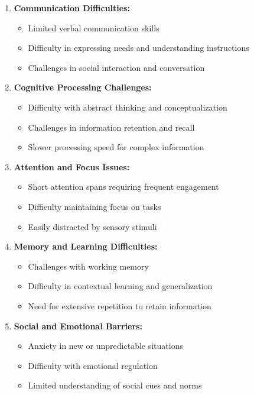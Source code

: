 \documentclass[12pt,a4paper]{article}
\begin{document}
\begin{enumerate}[leftmargin=*]
    \item \textbf{Communication Difficulties:}
    \begin{itemize}
        \item Limited verbal communication skills
        \item Difficulty in expressing needs and understanding instructions
        \item Challenges in social interaction and conversation
    \end{itemize}
    
    \item \textbf{Cognitive Processing Challenges:}
    \begin{itemize}
        \item Difficulty with abstract thinking and conceptualization
        \item Challenges in information retention and recall
        \item Slower processing speed for complex information
    \end{itemize}
    
    \item \textbf{Attention and Focus Issues:}
    \begin{itemize}
        \item Short attention spans requiring frequent engagement
        \item Difficulty maintaining focus on tasks
        \item Easily distracted by sensory stimuli
    \end{itemize}
    
    \item \textbf{Memory and Learning Difficulties:}
    \begin{itemize}
        \item Challenges with working memory
        \item Difficulty in contextual learning and generalization
        \item Need for extensive repetition to retain information
    \end{itemize}
    
    \item \textbf{Social and Emotional Barriers:}
    \begin{itemize}
        \item Anxiety in new or unpredictable situations
        \item Difficulty with emotional regulation
        \item Limited understanding of social cues and norms
    \end{itemize}
\end{enumerate}
\end{document}
